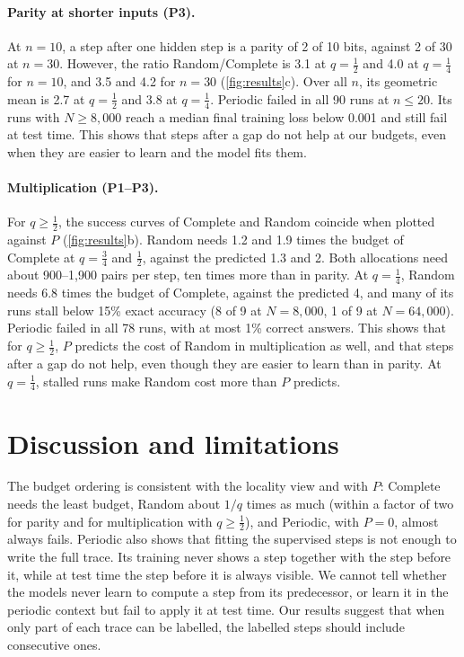 \documentclass{article}
\newcommand{\Nprob}{N}      %
\begin{document}
\paragraph{Parity at shorter inputs (P3).}
At $n=10$, a step after one hidden step is a parity of 2 of 10 bits, against
2 of 30 at $n=30$. However, the ratio Random/Complete is 3.1 at $q=\tfrac12$ and 4.0
at $q=\tfrac14$ for $n=10$, and 3.5 and 4.2 for $n=30$
(\cref{fig:results}c). Over all $n$, its geometric mean is 2.7 at
$q=\tfrac12$ and 3.8 at $q=\tfrac14$. Periodic failed in all 90 runs at
$n\le20$. Its runs with $\Nprob\ge8{,}000$ reach a median final training loss
below 0.001 and still fail at test time. This shows that steps after a gap
do not help at our budgets, even when they are easier to learn and the
model fits them.

\paragraph{Multiplication (P1--P3).}
For $q\ge\tfrac12$, the success curves of Complete and Random coincide when
plotted against $P$ (\cref{fig:results}b). Random needs 1.2 and 1.9 times the
budget of Complete at $q=\tfrac34$ and $\tfrac12$, against the predicted 1.3
and 2. Both allocations need about 900--1{,}900 pairs per step, ten times more than
in parity. At $q=\tfrac14$, Random needs 6.8 times the budget of Complete,
against the predicted 4, and many of its runs stall below 15\% exact
accuracy (8 of 9 at $\Nprob=8{,}000$, 1 of 9 at $\Nprob=64{,}000$). Periodic
failed in all 78 runs, with at most 1\% correct answers. This shows that for
$q\ge\tfrac12$, $P$ predicts the cost of Random in multiplication as
well, and that steps after a gap do not help, even though they
are easier to learn than in parity. At $q=\tfrac14$, stalled runs make Random cost
more than $P$ predicts.

\section{Discussion and limitations}
\label{sec:discussion}

The budget ordering is consistent with the locality view and with $P$:
Complete needs the least budget, Random about $1/q$ times as much (within a
factor of two for parity and for multiplication with $q\ge\tfrac12$), and
Periodic, with $P=0$, almost always fails. Periodic also shows that fitting
the supervised steps is not enough to write the full trace. Its training
never shows a step together with the step before it, while at test time the
step before it is always visible. We cannot tell whether the models never
learn to compute a step from its predecessor, or learn it in the periodic
context but fail to apply it at test time. Our results suggest that when only
part of each trace can be labelled, the labelled steps should include
consecutive ones.
\end{document}
